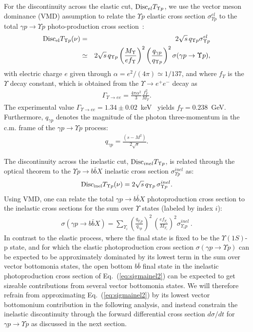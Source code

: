 \documentclass[prd,amsmath,%
twocolumn,floatfix,amssymb, preprintnumbers, nofootinbib, superscriptaddress]{revtex4}
\newcommand{\bea}{\begin{eqnarray}}
\newcommand{\eea}{\end{eqnarray}}
\begin{document}
For the 
discontinuity across the elastic cut, 
${\rm Disc}_{el} T_{\Upsilon p}$, we  use the vector meson dominance (VMD) assumption to relate the $\Upsilon p$ elastic cross section 
$\sigma_{\Upsilon p}^{el}$ to the total $\gamma p \to \Upsilon p$ photo-production cross section~\cite{Barger:1975ng,Redlich:2000cb}: 
\bea
{\rm Disc}_{\rm el} T_{\Upsilon p}(\nu)  &=& 2 \sqrt{s} \, q_{\Upsilon p} \sigma_{\Upsilon p}^{el} 
\label{eq:sigmael}
\\
&\simeq&  2 \sqrt{s} \, q_{\Upsilon p}  \left( \frac{M_\Upsilon}{e f_\Upsilon} \right)^2 \left( \frac{q_{\gamma p}}{q_{\Upsilon p}} \right)^2 
\sigma (\gamma p \to \Upsilon p), 
\nonumber
\eea
with electric charge $e$ given through $\alpha = e^2 / (4 \pi) \simeq 1/137$, and  where $f_\Upsilon$ is the $\Upsilon$ decay constant, which is obtained from the $\Upsilon \to e^+ e^-$ decay as 
\begin{eqnarray}
\Gamma_{\Upsilon \to ee} = \frac{4 \pi \alpha^2}{3} \frac{f_\Upsilon^2}{M_\Upsilon}.
\end{eqnarray}
The experimental value $\Gamma_{\Upsilon \to ee} =  1.34 \pm 0.02$~keV~\cite{Tanabashi:2018oca} yields $f_\Upsilon = 0.238$~GeV. Furthermore, $q_{\gamma p}$ denotes the magnitude of the 
photon three-momentum in the c.m. frame of the $\gamma p \to \Upsilon p$ process:
\bea
q_{\gamma p} = \frac{(s - M^2)}{2 \sqrt{s}}.
\eea

The discontinuity across the inelastic cut, ${\rm Disc}_{inel} T_{\Upsilon p}$, 
is related through the optical theorem to the $\Upsilon  p \to b \bar b X$ inelastic cross section 
$\sigma_{\Upsilon p}^{inel}$ as:
\bea
{\rm Disc}_{\rm inel} T_{\Upsilon p}(\nu) = 2 \sqrt{s} \, q_{\Upsilon p} \, \sigma_{\Upsilon p}^{inel}.    
\label{eq:sigmainel}
\eea
Using VMD, one can relate the total $\gamma p \to b \bar b X$ photoproduction cross section to the inelastic cross sections for the sum over $\Upsilon$ states (labeled by index $i$):
\begin{eqnarray}
\sigma (\gamma p \to b \bar b X) = \sum_{\Upsilon_i}
 \left( \frac{q_{\Upsilon_i p}}{q_{\gamma p}} \right)^2
 \,  \left( \frac{e f_{\Upsilon_i}}{M_{\Upsilon_i}} \right)^2  \sigma_{\Upsilon_i p}^{inel} \,  . 
\label{eq:sigmainel2}
\end{eqnarray}
In contrast to the elastic process, where the final state is fixed to be the $\Upsilon(1S)$-p state, and for which the elastic photoproduction cross section $\sigma (\gamma p \to \Upsilon p)$ can be expected to be approximately dominated by its lowest term in the sum over vector bottomonia states, the open bottom $b \bar b$ final state in the inelastic photoproduction cross section of Eq.~(\ref{eq:sigmainel2})  can be expected to get sizeable contributions from several vector bottomonia states. We will therefore refrain from approximating Eq.~(\ref{eq:sigmainel2}) by its lowest vector bottomonium contribution in the following analysis, and instead constrain the inelastic discontinuity through the forward differential cross section $d \sigma / dt$ for  $\gamma p \to \Upsilon p$ as discussed in the next section. 
\end{document}
